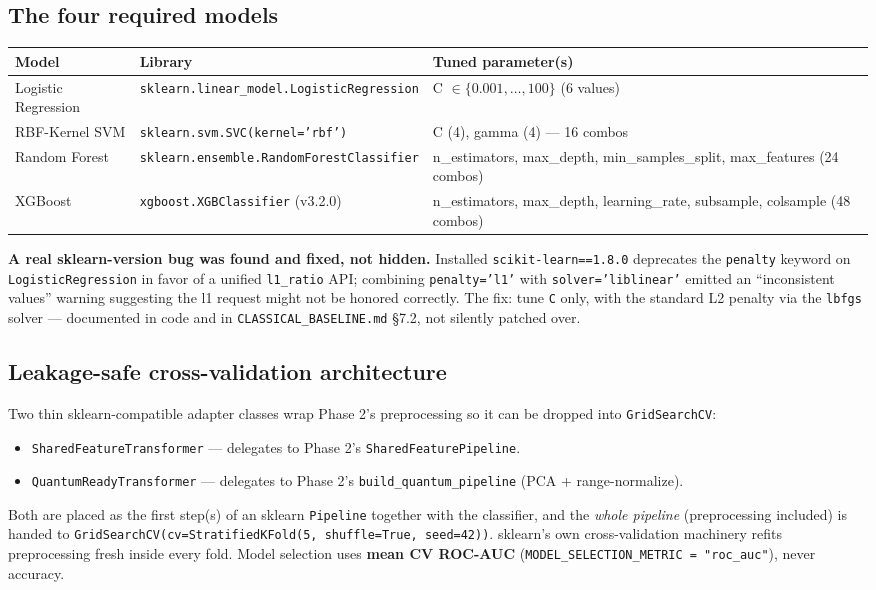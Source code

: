 \documentclass[11pt,a4paper]{article}
\newcommand{\code}[1]{\texttt{\small #1}}
\begin{document}
\subsection{The four required models}
\begin{tabularx}{\textwidth}{@{}p{2.3cm}p{4.6cm}Y@{}}
\toprule
\textbf{Model} & \textbf{Library} & \textbf{Tuned parameter(s)} \\
\midrule
Logistic Regression & {\footnotesize\texttt{sklearn.linear\_\allowbreak model.\allowbreak LogisticRegression}} & C $\in \{0.001,\ldots,100\}$ (6 values) \\
RBF-Kernel SVM & {\footnotesize\texttt{sklearn.svm.\allowbreak SVC(kernel='rbf')}} & C (4), gamma (4) --- 16 combos \\
Random Forest & {\footnotesize\texttt{sklearn.\allowbreak ensemble.\allowbreak RandomForestClassifier}} & n\_estimators, max\_depth, min\_samples\_split, max\_features (24 combos) \\
XGBoost & {\footnotesize\texttt{xgboost.\allowbreak XGBClassifier}} (v3.2.0) & n\_estimators, max\_depth, learning\_rate, subsample, colsample (48 combos) \\
\bottomrule
\end{tabularx}

\textbf{A real sklearn-version bug was found and fixed, not hidden.} Installed \code{scikit-learn==1.8.0} deprecates the \code{penalty} keyword on \code{LogisticRegression} in favor of a unified \code{l1\_ratio} API; combining \code{penalty='l1'} with \code{solver='liblinear'} emitted an ``inconsistent values'' warning suggesting the l1 request might not be honored correctly. The fix: tune \code{C} only, with the standard L2 penalty via the \code{lbfgs} solver --- documented in code and in \code{CLASSICAL\_BASELINE.md} \S7.2, not silently patched over.

\subsection{Leakage-safe cross-validation architecture}
Two thin sklearn-compatible adapter classes wrap Phase 2's preprocessing so it can be dropped into \code{GridSearchCV}:
\begin{itemize}[leftmargin=1.4em]
  \item \code{SharedFeatureTransformer} --- delegates to Phase 2's \code{SharedFeaturePipeline}.
  \item \code{QuantumReadyTransformer} --- delegates to Phase 2's \code{build\_quantum\_pipeline} (PCA + range-normalize).
\end{itemize}
Both are placed as the first step(s) of an sklearn \code{Pipeline} together with the classifier, and the \emph{whole pipeline} (preprocessing included) is handed to \code{GridSearchCV(cv=StratifiedKFold(5, shuffle=True, seed=42))}. sklearn's own cross-validation machinery refits preprocessing fresh inside every fold. Model selection uses \textbf{mean CV ROC-AUC} (\code{MODEL\_SELECTION\_METRIC = "roc\_auc"}), never accuracy.
\end{document}

